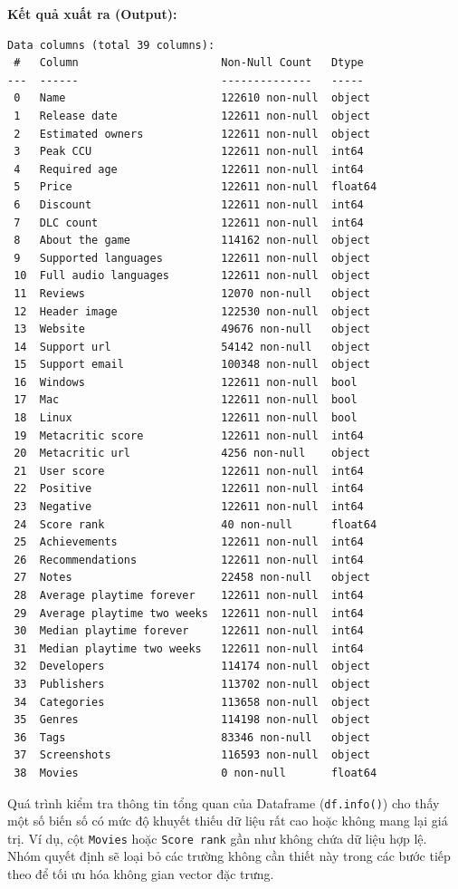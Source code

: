 \textbf{Kết quả xuất ra (Output):}
\begin{verbatim}
Data columns (total 39 columns):
 #   Column                      Non-Null Count   Dtype
---  ------                      --------------   -----
 0   Name                        122610 non-null  object
 1   Release date                122611 non-null  object
 2   Estimated owners            122611 non-null  object
 3   Peak CCU                    122611 non-null  int64
 4   Required age                122611 non-null  int64
 5   Price                       122611 non-null  float64
 6   Discount                    122611 non-null  int64
 7   DLC count                   122611 non-null  int64
 8   About the game              114162 non-null  object
 9   Supported languages         122611 non-null  object
 10  Full audio languages        122611 non-null  object
 11  Reviews                     12070 non-null   object
 12  Header image                122530 non-null  object
 13  Website                     49676 non-null   object
 14  Support url                 54142 non-null   object
 15  Support email               100348 non-null  object
 16  Windows                     122611 non-null  bool
 17  Mac                         122611 non-null  bool
 18  Linux                       122611 non-null  bool
 19  Metacritic score            122611 non-null  int64
 20  Metacritic url              4256 non-null    object
 21  User score                  122611 non-null  int64
 22  Positive                    122611 non-null  int64
 23  Negative                    122611 non-null  int64
 24  Score rank                  40 non-null      float64
 25  Achievements                122611 non-null  int64
 26  Recommendations             122611 non-null  int64
 27  Notes                       22458 non-null   object
 28  Average playtime forever    122611 non-null  int64
 29  Average playtime two weeks  122611 non-null  int64
 30  Median playtime forever     122611 non-null  int64
 31  Median playtime two weeks   122611 non-null  int64
 32  Developers                  114174 non-null  object
 33  Publishers                  113702 non-null  object
 34  Categories                  113658 non-null  object
 35  Genres                      114198 non-null  object
 36  Tags                        83346 non-null   object
 37  Screenshots                 116593 non-null  object
 38  Movies                      0 non-null       float64
\end{verbatim}

\hspace{1cm} Quá trình kiểm tra thông tin tổng quan của Dataframe (\texttt{df.info()}) cho thấy một số biến số có mức độ khuyết thiếu dữ liệu rất cao hoặc không mang lại giá trị. Ví dụ, cột \texttt{Movies} hoặc \texttt{Score rank} gần như không chứa dữ liệu hợp lệ. Nhóm quyết định sẽ loại bỏ các trường không cần thiết này trong các bước tiếp theo để tối ưu hóa không gian vector đặc trưng.

